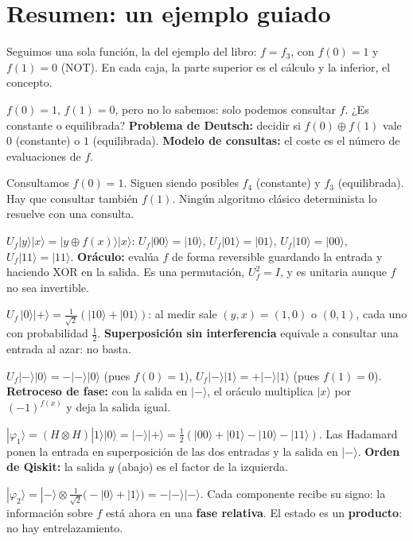 \documentclass[11pt, a4paper, twoside, openright]{report}
\newcommand{\pasoguiado}[3]{%
\begin{tcolorbox}[colback=gray!6!white,colframe=gray!55!black,title={#1}]
#2
\tcblower
\small #3
\end{tcolorbox}}
\providecommand{\ket}[1]{|#1\rangle}
\begin{document}
\cleardoublepage
\section{Resumen: un ejemplo guiado}

\noindent Seguimos una sola función, la del ejemplo del libro: $f = f_3$, con $f(0) = 1$ y $f(1) = 0$ (NOT). En cada caja, la parte superior es el cálculo y la inferior, el concepto.

\pasoguiado{Paso 1. El problema}
{$f(0) = 1$, $f(1) = 0$, pero no lo sabemos: solo podemos consultar $f$. ¿Es constante o equilibrada?}
{\textbf{Problema de Deutsch:} decidir si $f(0)\oplus f(1)$ vale $0$ (constante) o $1$ (equilibrada). \textbf{Modelo de consultas:} el coste es el número de evaluaciones de $f$.}

\pasoguiado{Paso 2. Clásicamente, dos consultas}
{Consultamos $f(0) = 1$. Siguen siendo posibles $f_4$ (constante) y $f_3$ (equilibrada). Hay que consultar también $f(1)$.}
{Ningún algoritmo clásico determinista lo resuelve con una consulta.}

\pasoguiado{Paso 3. El oráculo}
{$U_f\ket{y}\ket{x} = \ket{y\oplus f(x)}\ket{x}$: \; $U_f\ket{00} = \ket{10}$, \; $U_f\ket{01} = \ket{01}$, \; $U_f\ket{10} = \ket{00}$, \; $U_f\ket{11} = \ket{11}$.}
{\textbf{Oráculo:} evalúa $f$ de forma reversible guardando la entrada y haciendo XOR en la salida. Es una permutación, $U_f^2 = I$, y es unitaria aunque $f$ no sea invertible.}

\pasoguiado{Paso 4. Primer intento}
{$U_f\,\ket{0}\ket{+} = \tfrac{1}{\sqrt2}(\ket{10}+\ket{01})$: al medir sale $(y, x) = (1, 0)$ o $(0, 1)$, cada uno con probabilidad $\frac12$.}
{\textbf{Superposición sin interferencia} equivale a consultar una entrada al azar: no basta.}

\pasoguiado{Paso 5. El retroceso de fase}
{$U_f\ket{-}\ket{0} = -\ket{-}\ket{0}$ \;(pues $f(0) = 1$), \qquad $U_f\ket{-}\ket{1} = +\ket{-}\ket{1}$ \;(pues $f(1) = 0$).}
{\textbf{Retroceso de fase:} con la salida en $\ket{-}$, el oráculo multiplica $\ket{x}$ por $(-1)^{f(x)}$ y deja la salida igual.}

\pasoguiado{Paso 6. Superposición}
{$\ket{\varphi_1} = (H\otimes H)\ket{1}\ket{0} = \ket{-}\ket{+} = \tfrac12(\ket{00}+\ket{01}-\ket{10}-\ket{11})$.}
{Las Hadamard ponen la entrada en superposición de las dos entradas y la salida en $\ket{-}$. \textbf{Orden de Qiskit:} la salida $y$ (abajo) es el factor de la izquierda.}

\pasoguiado{Paso 7. Una consulta}
{$\ket{\varphi_2} = \ket{-}\otimes\tfrac{1}{\sqrt2}\big(-\ket{0}+\ket{1}\big) = -\ket{-}\ket{-}$.}
{Cada componente recibe su signo: la información sobre $f$ está ahora en una \textbf{fase relativa}. El estado es un \textbf{producto}: no hay entrelazamiento.}
\end{document}
